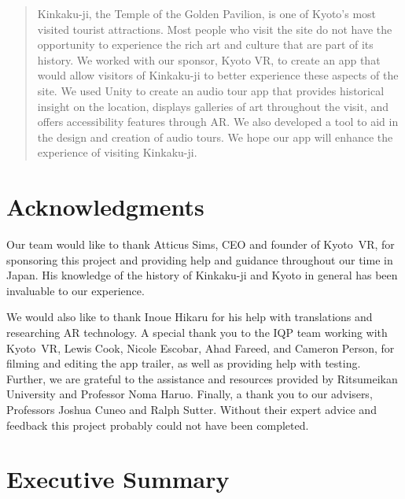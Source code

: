 \documentclass[a4paper, 10pt, american, titlepage]{article}
\begin{document}

\begin{abstract}
Kinkaku-ji, the Temple of the Golden Pavilion, is one of Kyoto's most visited
tourist attractions. Most people who visit the site do not have the opportunity
to experience the rich art and culture that are part of its history. We worked
with our sponsor, Kyoto VR, to create an app that would allow visitors of
Kinkaku-ji to better experience these aspects of the site. We used Unity to
create an audio tour app that provides historical insight on the location,
displays galleries of art throughout the visit, and offers accessibility
features through AR. We also developed a tool to aid in the design and creation
of audio tours. We hope our app will enhance the experience of visiting
Kinkaku-ji.  
\end{abstract}

\section*{Acknowledgments}
\label{sec:acknowledgements}

Our team would like to thank Atticus Sims, CEO and founder of Kyoto~VR, for
sponsoring this project and providing help and guidance throughout our time in
Japan. His knowledge of the history of Kinkaku-ji and Kyoto in general has been
invaluable to our experience.

We would also like to thank Inoue Hikaru for his help with translations and
researching AR technology. A special thank you to the IQP team working with
Kyoto~VR, Lewis Cook, Nicole Escobar, Ahad Fareed, and Cameron Person, for
filming and editing the app trailer, as well as providing help with testing.
Further, we are grateful to the assistance and resources provided by Ritsumeikan
University and Professor Noma Haruo. Finally, a thank you to our advisers,
Professors Joshua Cuneo and Ralph Sutter. Without their expert advice and
feedback this project probably could not have been completed.

\clearpage

\section*{Executive Summary}
\label{sec:executiveSummary}
\end{document}
